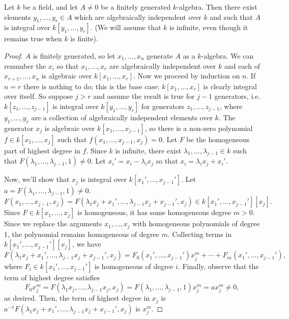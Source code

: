 Let $k$ be a field, and let $A \neq 0$ be a finitely generated $k$-algebra. Then there exist elements $y_1,\ldots,y_r \in A$ which are
algebraically independent over $k$ and such that $A$ is integral over $k[y_1,\ldots,y_r]$. (We will assume that $k$ is infinite, even
though it remains true when $k$ is finite).

\begin{proof}
$A$ is finitely generated, so let $x_1,\ldots,x_n$ generate $A$ as a $k$-algebra. We can renumber the $x_i$ so that $x_1,\ldots,x_r$
are algebraically independent over $k$ and each of $x_{r+1},\ldots,x_n$ is algebraic over $k[x_1,\ldots,x_r]$. Now we proceed by induction
on $n$. If $n = r$ there is nothing to do; this is the base case: $k[x_1,\ldots,x_r]$ is clearly integral over itself. So suppose $j > r$ 
and assume the result is true for $j - 1$ generators, i.e. $k[z_1,\ldots,z_{j-1}]$ is integral over $k[y_1,\ldots,y_r]$ for generators 
$z_1,\ldots,z_{j-1}$, where $y_1,\ldots,y_r$ are a collection of algebraically independent elements over $k$. The generator $x_j$ is algebraic 
over $k[x_1,\ldots,x_{j-1}]$, so there is a non-zero polynomial $f \in k[x_1,\ldots,x_j]$ such that $f(x_1,\ldots,x_{j-1},x_j) = 0$. Let $F$ 
be the homogeneous part of highest degree in $f$. Since $k$ is infinite, there exist $\lambda_1,\ldots,\lambda_{j-1} \in k$ such that 
$F(\lambda_1,\ldots,\lambda_{j-1},1) \neq 0$. Let $x_i' = x_i - \lambda_i x_j$ so that $x_i = \lambda_i x_j + x_i'$.

Now, we'll show that $x_j$ is integral over $k[x_1',\ldots,x_{j-1}']$. Let $a = F(\lambda_1,\ldots,\lambda_{j-1},1) \neq 0$.
$$F(x_1,\ldots,x_{j-1},x_j) = F(\lambda_1 x_j + x_1',\ldots, \lambda_{j-1} x_j + x_{j-1}', x_j) \in k[x_1',\ldots,x_{j-1}'][x_j].$$
Since $F \in k[x_1,\ldots,x_j]$ is homogeneous, it has some homogeneous degree $m > 0$. Since we replace the arguments $x_1,\ldots,x_j$
with homogeneous polynomials of degree 1, the polynomial remains homogeneous of degree $m$. Collecting terms in $k[x_1',\ldots,x_{j-1}'][x_j]$,
we have
$$F(\lambda_1 x_j + x_1',\ldots, \lambda_{j-1} x_j + x_{j-1}', x_j) = F_0(x_1',\ldots,x_{j-1}') x_j^m + \cdots + F_m(x_1',\ldots,x_{j-1}'),$$
where $F_i \in k[x_1',\ldots,x_{j-1}']$ is homogeneous of degree $i$. Finally, observe that the term of highest degree satisfies
$$F_0 x_j^m = F(\lambda_1 x_j,\ldots, \lambda_{j-1} x_j, x_j) = F(\lambda_1, \ldots, \lambda_{j-1}, 1)x_j^m = ax_j^m \neq 0,$$
as desired. Then, the term of highest degree in $x_j$ is $a^{-1}F(\lambda_1 x_j + x_1',\ldots, \lambda_{j-1} x_j + x_{j-1}', x_j)$ is $x_j^m$.


\end{proof}
